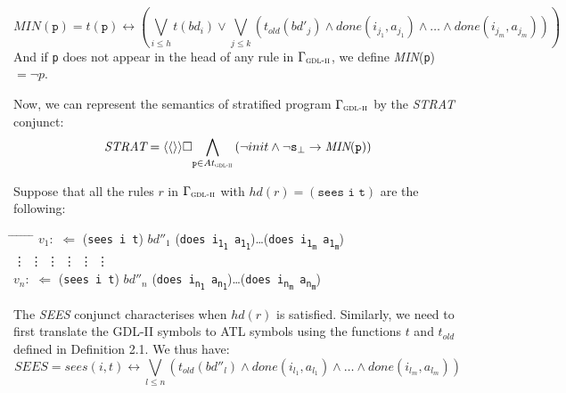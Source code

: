 \documentclass{article}
\theoremstyle{theorem}
\theoremstyle{lemma}
\theoremstyle{definition}
\theoremstyle{remark}
\begin{document}
\[
    \textit{MIN}(\texttt{p}) = t(\texttt{p}) \leftrightarrow \left(\underset{i \leq h}{\bigvee} t(bd_i) \vee \underset{j \leq k}{\bigvee} (t_\textit{old} (bd'_j) \wedge done(i_{j_{1}},a_{j_{1}}) \wedge \ldots \wedge done(i_{j_{m}},a_{j_{m}})) \right)
\]
And if \texttt{p} does not appear in the head of any rule in $\Gamma_\textsc{gdl-ii}$, we define \textit{MIN}(\texttt{p}) $= \neg p$.
\par Now, we can represent the semantics of stratified program $\Gamma_\textsc{gdl-ii}$ by the \textit{STRAT} conjunct:
\[
    \textit{STRAT} = \langle \langle \rangle \rangle \square \underset{\texttt{p} \in At_\textsc{gdl-ii}}{\bigwedge} \left(\neg init \wedge \neg \texttt{s}_\bot \rightarrow \textit{MIN}(\texttt{p}) \right)
\]
\par Suppose that all the rules $r$ in  $\Gamma_\textsc{gdl-ii}$ with $hd(r) = (\texttt{sees i t})$ are the following:
\begin{tabbing}
    \hspace{2cm} \= \hspace{0.5cm} \= \hspace{0.3cm} \= \hspace{1.8cm} \= \hspace{0.5cm} \= \hspace{0.4cm} \= \kill
    \> $v_1:$ \> $\Leftarrow$ \> (\texttt{sees i t}) \> $bd''_1$ \> \> (\texttt{does i\textsubscript{\texttt{1}\textsubscript{\texttt{1}}} a\textsubscript{\texttt{1}\textsubscript{\texttt{1}}}})\ldots (\texttt{does i\textsubscript{\texttt{1}\textsubscript{\texttt{m}}} a\textsubscript{\texttt{1}\textsubscript{\texttt{m}}}}) \\
    \> \vdots \> \vdots \> \vdots \> \vdots \> \vdots \> \vdots \\
    \> $v_n:$ \> $\Leftarrow$ \> (\texttt{sees i t}) \> $bd''_n$ \> \> (\texttt{does i\textsubscript{\texttt{n}\textsubscript{\texttt{1}}} a\textsubscript{\texttt{n}\textsubscript{\texttt{1}}}})\ldots (\texttt{does i\textsubscript{\texttt{n}\textsubscript{\texttt{m}}} a\textsubscript{\texttt{n}\textsubscript{\texttt{m}}}})
\end{tabbing}
\par The \textit{SEES} conjunct characterises when $hd(r)$ is satisfied. Similarly, we need to first translate the GDL-II symbols to ATL symbols using the functions $t$ and $t_{old}$ defined in Definition 2.1. We thus have:
\[
    \textit{SEES} = sees(i,t) \leftrightarrow \underset{l \leq n}{\bigvee} \left( t_\textit{old} (bd''_l) \wedge done(i_{l_{1}},a_{l_{1}}) \wedge \ldots \wedge done(i_{l_{m}},a_{l_{m}}) \right)
\]
\end{document}

